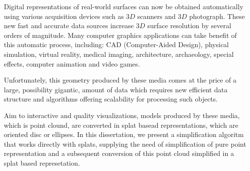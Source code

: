 \begin{foreignabstract}
Digital representations of real-world surfaces can now be obtained
automatically using various acquisition devices such as $3D$ scanners and $3D$
photograph. These new fast and accurate data sources increase $3D$ surface
resolution by several orders of magnitude. Many computer graphics applications
can take benefit of this automatic process, including: CAD (Computer-Aided
Design), physical simulation, virtual reality, medical imaging, architecture,
archaeology, special effects, computer animation and video games.

Unfortunately, this geometry produced by these media comes at the price of a
large, possibility gigantic, amount of data which requires new efficient data
structure and algorithms offering scalability for processing such objects.

Aim to interactive and quality visualizations, models produced by these media,
which is point clound, are converted in splat basead representations, which are
oriented disc or ellipses. In this dissertation, we present a
simplification algoritm that works directly with splats, supplying the need of
simplification of pure point representation and a subsequent conversion of this
point cloud simplified in a splat based represetation.


\end{foreignabstract}

